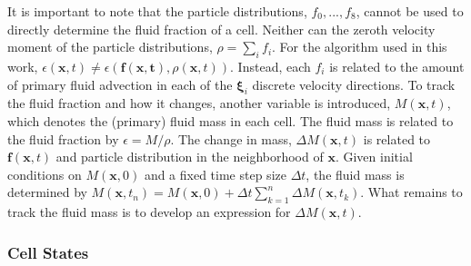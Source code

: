 \documentclass[pdftex,ms]{pittetd}
\newcommand{\pos}{\mathbf{x}}
\newcommand{\pvel}{\boldsymbol{\xi}}
\begin{document}
It is important to note that the particle distributions, $f_0, ..., f_8$, cannot be used to directly determine the fluid fraction of a cell.
Neither can the zeroth velocity moment of the particle distributions, $\rho = \sum_i f_i$.
For the algorithm used in this work, $\epsilon(\pos, t) \neq \epsilon(\mathbf{f(\pos, t)}, \rho(\pos, t))$.
Instead, each $f_i$ is related to the amount of primary fluid advection in each of the $\pvel_i$ discrete velocity directions.
To track the fluid fraction and how it changes, another variable is introduced, $M(\pos, t)$, which denotes the (primary) fluid mass in each cell.
The fluid mass is related to the fluid fraction by $\epsilon = M / \rho$.
The change in mass, $\Delta M(\pos, t)$ is related to $\mathbf{f}(\pos, t)$ and particle distribution in the neighborhood of $\pos$.
Given initial conditions on $M(\pos, 0)$ and a fixed time step size $\Delta t $, the fluid mass is determined by $M(\pos, t_n) = M(\pos, 0) + \Delta t \sum_{k=1}^n \Delta M(\pos, t_k)$.
What remains to track the fluid mass is to develop an expression for $\Delta M(\pos, t)$.

\newcommand{\opidx}{{\bar{i}}}
\newcommand{\fset}{\mathcal{F}}
\newcommand{\iset}{\mathcal{I}}
\newcommand{\gset}{\mathcal{G}}
\newcommand{\domain}{\mathcal{X}}

\subsubsection{Cell States} \label{sec:mass-transfer}
\end{document}

